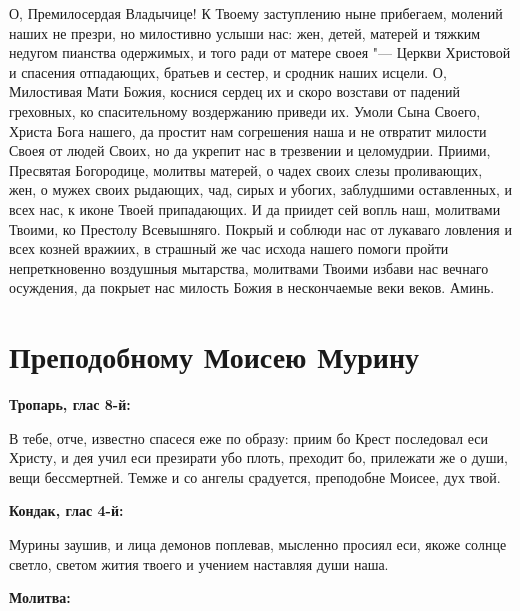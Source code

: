 О, Премилосердая Владычице! К Твоему заступлению ныне прибегаем, молений наших не презри, но милостивно услыши нас: жен, детей, матерей и тяжким недугом пианства одержимых, и того ради от матере своея "--- Церкви Христовой и спасения отпадающих, братьев и сестер, и сродник наших исцели. О, Милостивая Мати Божия, коснися сердец их и скоро возстави от падений греховных, ко спасительному воздержанию приведи их. Умоли Сына Своего, Христа Бога нашего, да простит нам согрешения наша и не отвратит милости Своея от людей Своих, но да укрепит нас в трезвении и целомудрии. Приими, Пресвятая Богородице, молитвы матерей, о чадех своих слезы проливающих, жен, о мужех своих рыдающих, чад, сирых и убогих, заблудшими оставленных, и всех нас, к иконе Твоей припадающих. И да приидет сей вопль наш, молитвами Твоими, ко Престолу Всевышняго. Покрый и соблюди нас от лукаваго ловления и всех козней вражиих, в страшный же час исхода нашего помоги пройти непреткновенно воздушныя мытарства, молитвами Твоими избави нас вечнаго осуждения, да покрыет нас милость Божия в нескончаемые веки веков. Аминь.


\section{Преподобному Моисею Мурину}
 


\bfseries Тропарь, глас 8-й:\normalfont{}


В тебе, отче, известно спасеся еже по образу: приим бо Крест последовал еси Христу, и дея учил еси презирати убо плоть, преходит бо, прилежати же о души, вещи бессмертней. Темже и со ангелы срадуется, преподобне Моисее, дух твой.


\medskip


\bfseries Кондак, глас 4-й:\normalfont{}


Мурины заушив, и лица демонов поплевав, мысленно просиял еси, якоже солнце светло, светом жития твоего и учением наставляя души наша.


\medskip


\bfseries Молитва:\normalfont{}


